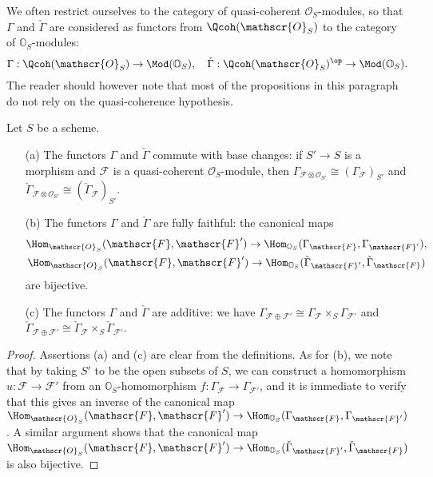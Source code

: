 We often restrict ourselves to the category of quasi-coherent $\mathscr{O}_S$-modules, so that $\Gamma$ and $\check{\Gamma}$ are considered as functors from $\Qcoh(\mathscr{O}_S)$ to the category of $\mathbb{O}_S$-modules:
\[\Gamma:\Qcoh(\mathscr{O}_S)\to\Mod(\mathbb{O}_S),\quad \check{\Gamma}:\Qcoh(\mathscr{O}_S)^{\op}\to\Mod(\mathbb{O}_S).\]
The reader should however note that most of the propositions in this paragraph do not rely on the quasi-coherence hypothesis.
\begin{proposition}\label{scheme Gamma module functor prop}
Let $S$ be a scheme.
\begin{enumerate}
    \item[(a)] The functors $\Gamma$ and $\check{\Gamma}$ commute with base changes: if $S'\to S$ is a morphism and $\mathscr{F}$ is a quasi-coherent $\mathscr{O}_S$-module, then $\Gamma_{\mathscr{F}\otimes\mathscr{O}_{S'}}\cong (\Gamma_{\mathscr{F}})_{S'}$ and $\check{\Gamma}_{\mathscr{F}\otimes\mathscr{O}_{S'}}\cong (\check{\Gamma}_{\mathscr{F}})_{S'}$.
    \item[(b)] The functors $\Gamma$ and $\check{\Gamma}$ are fully faithful: the canonical maps
    \begin{gather*}
    \Hom_{\mathscr{O}_S}(\mathscr{F},\mathscr{F}')\to\Hom_{\mathbb{O}_S}(\Gamma_\mathscr{F},\Gamma_{\mathscr{F}'}),\\
    \Hom_{\mathscr{O}_S}(\mathscr{F},\mathscr{F}')\to\Hom_{\mathbb{O}_S}(\check{\Gamma}_{\mathscr{F}'},\check{\Gamma}_{\mathscr{F}})
    \end{gather*}
    are bijective.
    \item[(c)] The functors $\Gamma$ and $\check{\Gamma}$ are additive: we have $\Gamma_{\mathscr{F}\oplus\mathscr{F}'}\cong \Gamma_\mathscr{F}\times_S\Gamma_{\mathscr{F}'}$ and $\check{\Gamma}_{\mathscr{F}\oplus\mathscr{F}'}\cong \check{\Gamma}_\mathscr{F}\times_S\check{\Gamma}_{\mathscr{F}'}$.
\end{enumerate}
\end{proposition}
\begin{proof}
Assertions (a) and (c) are clear from the definitions. As for (b), we note that by taking $S'$ to be the open subsets of $S$, we can construct a homomorphism $u:\mathscr{F}\to\mathscr{F}'$ from an $\mathbb{O}_S$-homomorphism $f:\Gamma_\mathscr{F}\to\Gamma_{\mathscr{F}'}$, and it is immediate to verify that this gives an inverse of the canonical map $\Hom_{\mathscr{O}_S}(\mathscr{F},\mathscr{F}')\to\Hom_{\mathbb{O}_S}(\Gamma_\mathscr{F},\Gamma_{\mathscr{F}'})$. A similar argument shows that the canonical map $\Hom_{\mathscr{O}_S}(\mathscr{F},\mathscr{F}')\to\Hom_{\mathbb{O}_S}(\check{\Gamma}_{\mathscr{F}'},\check{\Gamma}_{\mathscr{F}})$ is also bijective.
\end{proof}

